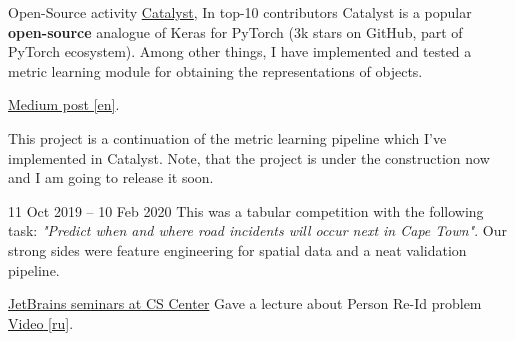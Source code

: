 
\cvevent
{Open-Source activity}
{\href{https://github.com/catalyst-team/catalyst}{\underline{Catalyst}}, In top-10 contributors}{}{}
Catalyst is a popular \textbf{open-source} analogue of Keras for PyTorch (3k stars on GitHub, part of PyTorch ecosystem).
Among other things, I have implemented and tested a metric learning module for obtaining the representations of objects.
\smallskip

\href{https://medium.com/pytorch/metric-learning-with-catalyst-8c8337dfab1a}{\underline{Medium post} [en]}.

\smallskip
\smallskip
\smallskip

This project is a continuation of the metric learning pipeline which I've implemented in Catalyst.
Note, that the project is under the construction now and I am going to release it soon.


\divider

{11 Oct 2019 -- 10 Feb 2020}{}
This was a tabular competition with the following task: \textit{"Predict when and where road incidents will occur next in Cape Town"}. 
Our strong sides were feature engineering for spatial data and a neat validation pipeline.
\smallskip


\divider

\cvevent
{\href{https://research.jetbrains.org/groups/plt_lab/seminars}{JetBrains seminars at CS Center}}
{Gave a lecture about Person Re-Id problem}
{}
{}
{\href{https://youtu.be/O8qtBYeOSKE}{\underline{Video} [ru]}.}
